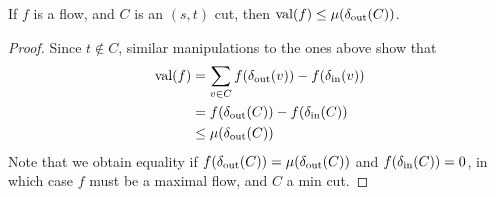 \begin{lemma}
    If $f$ is a flow, and $C$ is an $(s,t)$ cut, then $\text{val}(f) \leq \mu(\operatorname{\delta_{\text{out}}}(C))$.
\end{lemma}
\begin{proof}
    Since $t \not \in C$, similar manipulations to the ones above show that
    \begin{align*}
        \text{val}(f) &= \sum_{v \in C} f(\operatorname{\delta_{\text{out}}}(v)) - f(\operatorname{\delta_{\text{in}}}(v))\\
        &= f(\operatorname{\delta_{\text{out}}}(C)) - f(\operatorname{\delta_{\text{in}}}(C))\\
        &\leq \mu(\operatorname{\delta_{\text{out}}}(C))
    \end{align*}
    Note that we obtain equality if $f(\operatorname{\delta_{\text{out}}}(C)) = \mu(\operatorname{\delta_{\text{out}}}(C))$ and $f(\operatorname{\delta_{\text{in}}}(C)) = 0$, in which case $f$ must be a maximal flow, and $C$ a min cut.
\end{proof}

